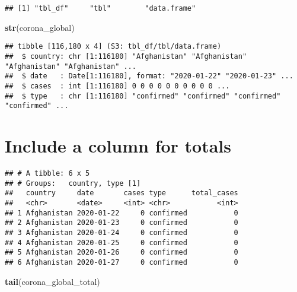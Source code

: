 \documentclass[
]{article}
\newenvironment{Shaded}{\begin{snugshade}}{\end{snugshade}}
\newcommand{\DataTypeTok}[1]{\textcolor[rgb]{0.13,0.29,0.53}{#1}}
\newcommand{\KeywordTok}[1]{\textcolor[rgb]{0.13,0.29,0.53}{\textbf{#1}}}
\newcommand{\NormalTok}[1]{#1}
\newcommand{\OperatorTok}[1]{\textcolor[rgb]{0.81,0.36,0.00}{\textbf{#1}}}
\newcommand{\StringTok}[1]{\textcolor[rgb]{0.31,0.60,0.02}{#1}}
\begin{document}
\begin{verbatim}
## [1] "tbl_df"     "tbl"        "data.frame"
\end{verbatim}

\begin{Shaded}
\begin{Highlighting}[]
\KeywordTok{str}\NormalTok{(corona_global)}
\end{Highlighting}
\end{Shaded}

\begin{verbatim}
## tibble [116,180 x 4] (S3: tbl_df/tbl/data.frame)
##  $ country: chr [1:116180] "Afghanistan" "Afghanistan" "Afghanistan" "Afghanistan" ...
##  $ date   : Date[1:116180], format: "2020-01-22" "2020-01-23" ...
##  $ cases  : int [1:116180] 0 0 0 0 0 0 0 0 0 0 ...
##  $ type   : chr [1:116180] "confirmed" "confirmed" "confirmed" "confirmed" ...
\end{verbatim}

\hypertarget{include-a-column-for-totals}{%
\section{Include a column for
totals}\label{include-a-column-for-totals}}

\begin{Shaded}
\end{Shaded}

\begin{verbatim}
## # A tibble: 6 x 5
## # Groups:   country, type [1]
##   country     date       cases type      total_cases
##   <chr>       <date>     <int> <chr>           <int>
## 1 Afghanistan 2020-01-22     0 confirmed           0
## 2 Afghanistan 2020-01-23     0 confirmed           0
## 3 Afghanistan 2020-01-24     0 confirmed           0
## 4 Afghanistan 2020-01-25     0 confirmed           0
## 5 Afghanistan 2020-01-26     0 confirmed           0
## 6 Afghanistan 2020-01-27     0 confirmed           0
\end{verbatim}

\begin{Shaded}
\begin{Highlighting}[]
\KeywordTok{tail}\NormalTok{(corona_global_total)}
\end{Highlighting}
\end{Shaded}
\end{document}
